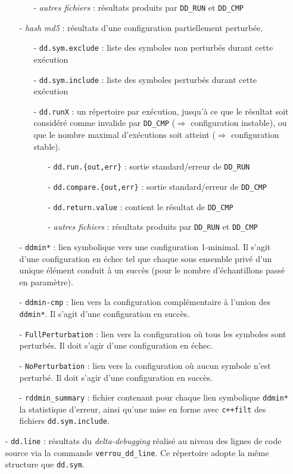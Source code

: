 \documentclass[a4paper]{article}
\begin{document}
\begin{itemize}
\begin{itemize}
\begin{itemize}
    \item[- \it autres fichiers] : résultats produits par \texttt{DD\_RUN} et \texttt{DD\_CMP} 
    \end{itemize}
  \item[- \it hash md5] : résultats d'une configuration partiellement perturbée.
    \begin{itemize}
    \item[- \tt dd.sym.exclude] : liste des symboles non perturbés durant cette
      exécution
    \item[- \tt dd.sym.include] : liste des symboles perturbés durant cette
      exécution
    \item[- \tt dd.runX] : un répertoire par exécution, jusqu'à ce que le
      résultat soit considéré comme invalide par \texttt{DD\_CMP} ($\Rightarrow$
      configuration instable), ou que le nombre maximal d'exécutions soit
      atteint ($\Rightarrow$ configuration stable).
      \begin{itemize}
      \item[- \tt dd.run.\{out,err\}] : sortie standard/erreur de
        \texttt{DD\_RUN}
      \item[- \tt dd.compare.\{out,err\}] : sortie standard/erreur de
        \texttt{DD\_CMP}
      \item[- \tt dd.return.value] : contient le résultat  de \texttt{DD\_CMP} 
      \item[- \it autres fichiers] : résultats produits par \texttt{DD\_RUN} et \texttt{DD\_CMP}
      \end{itemize}
    \end{itemize}
  \item[- \tt ddmin*] : lien symbolique vers une configuration 1-minimal. Il s'agit d'une configuration en échec tel que chaque sous ensemble privé d'un unique élément conduit à un succès (pour le nombre d'échantillons passé en paramètre).
  \item[- \tt ddmin-cmp] : lien vers la configuration complémentaire à l'union des \texttt{ddmin*}. Il s'agit d'une configuration en succès.
  \item[- \tt FullPerturbation ] : lien vers la configuration où tous les symboles sont perturbés.  Il doit s'agir d'une configuration en échec.
  \item[- \tt NoPerturbation ] : lien vers la configuration où aucun symbole n'est perturbé.  Il doit s'agir d'une configuration en succès.
  \item[- \tt rddmin\_summary] : fichier contenant pour chaque lien symbolique \texttt{ddmin*} la statistique d'erreur, ainsi qu'une mise en forme avec \texttt{c++filt} des fichiers \texttt{dd.sym.include}.
  \end{itemize}
  
\item[- \tt dd.line] : résultats du \textit{delta-debugging}
  réalisé au niveau des lignes de code source via la commande \texttt{verrou\_dd\_line}. Ce répertoire adopte
  la même structure que \texttt{dd.sym}. 
\end{itemize}
\end{document}
